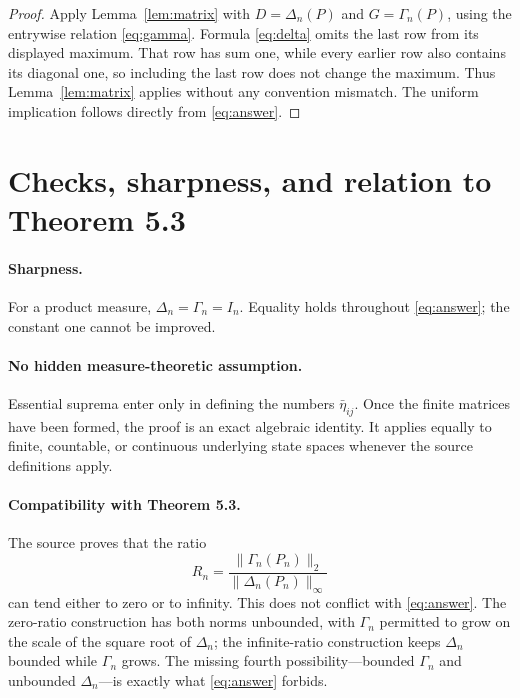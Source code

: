 \documentclass[11pt]{article}
\begin{document}
\begin{proof}
Apply Lemma~\ref{lem:matrix} with $D=\Delta_n(P)$ and
$G=\Gamma_n(P)$, using the entrywise relation \eqref{eq:gamma}.  Formula
\eqref{eq:delta} omits the last row from its displayed maximum.  That row has
sum one, while every earlier row also contains its diagonal one, so including
the last row does not change the maximum.  Thus Lemma~\ref{lem:matrix} applies
without any convention mismatch.  The uniform implication follows directly
from \eqref{eq:answer}.
\end{proof}

\section{\hspace{0.25em}Checks, sharpness, and relation to Theorem 5.3}

\paragraph{Sharpness.}
For a product measure, $\Delta_n=\Gamma_n=I_n$.  Equality holds throughout
\eqref{eq:answer}; the constant one cannot be improved.

\paragraph{No hidden measure-theoretic assumption.}
Essential suprema enter only in defining the numbers $\bar\eta_{ij}$.  Once
the finite matrices have been formed, the proof is an exact algebraic
identity.  It applies equally to finite, countable, or continuous underlying
state spaces whenever the source definitions apply.

\paragraph{Compatibility with Theorem 5.3.}
The source proves that the ratio
\[
       R_n=\frac{\lVert\Gamma_n(P_n)\rVert_2}
                  {\lVert\Delta_n(P_n)\rVert_\infty}
\]
can tend either to zero or to infinity.  This does not conflict with
\eqref{eq:answer}.  The zero-ratio construction has both norms unbounded, with
$\Gamma_n$ permitted to grow on the scale of the square root of $\Delta_n$;
the infinite-ratio construction keeps $\Delta_n$ bounded while $\Gamma_n$
grows.  The missing fourth possibility---bounded $\Gamma_n$ and unbounded
$\Delta_n$---is exactly what \eqref{eq:answer} forbids.
\end{document}
